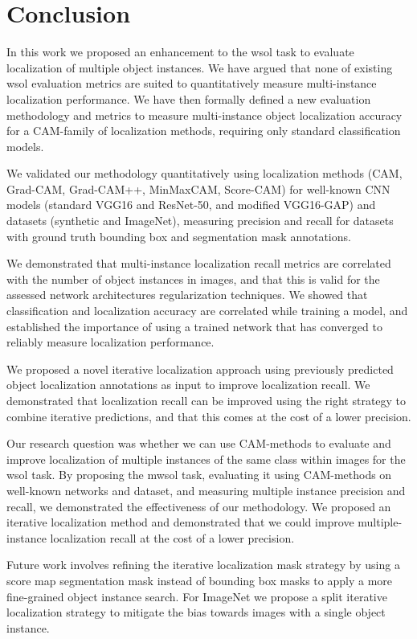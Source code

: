 \chapter{Conclusion}

In this work we proposed an enhancement to the \acrlong{wsol} task to evaluate localization of multiple object instances. We have argued that none of existing \acrshort{wsol} evaluation metrics are suited to quantitatively measure multi-instance localization performance. We have then formally defined a new evaluation methodology and metrics to measure multi-instance object localization accuracy for a CAM-family of localization methods, requiring only standard classification models.

We validated our methodology quantitatively using localization methods (CAM, Grad-CAM, Grad-CAM++, MinMaxCAM, Score-CAM) for well-known CNN models (standard VGG16 and ResNet-50, and modified VGG16-GAP) and datasets (synthetic and ImageNet), measuring precision and recall for datasets with ground truth bounding box and segmentation mask annotations.

We demonstrated that multi-instance localization recall metrics are correlated with the number of object instances in images, and that this is valid for the assessed network architectures regularization techniques. We showed that classification and localization accuracy are correlated while training a model, and established the importance of using a trained network that has converged to reliably measure localization performance.

We proposed a novel iterative localization approach using previously predicted object localization annotations as input to improve localization recall. We demonstrated that localization recall can be improved using the right strategy to combine iterative predictions, and that this comes at the cost of a lower precision.

Our research question was whether we can use CAM-methods to evaluate and improve localization of multiple instances of the same class within images for the \acrshort{wsol} task. By proposing the \acrshort{mwsol} task, evaluating it using CAM-methods on well-known networks and dataset, and measuring multiple instance precision and recall, we demonstrated the effectiveness of our methodology. We proposed an iterative localization method and demonstrated that we could improve multiple-instance localization recall at the cost of a lower precision.

Future work involves refining the iterative localization mask strategy by using a score map segmentation mask instead of bounding box masks to apply a more fine-grained object instance search. For ImageNet we propose a split iterative localization strategy to mitigate the bias towards images with a single object instance.
